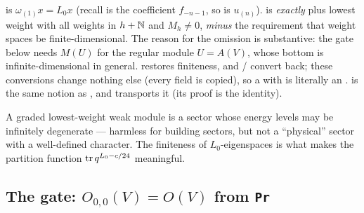 \begin{dictionary}
 is $\omega_{(1)}x = L_0x$ (recall  is the coefficient $f_{-n-1}$, so
 is $u_{(n)}$).  is \emph{exactly}  plus lowest weight
 with all weights in $h+{\mathbb{N}}$ and $M_h\neq0$, \emph{minus} the requirement that weight spaces be finite-dimensional. The
reason for the omission is substantive: the gate below needs $M(U)$ for the regular module $U = A(V)$, whose bottom is
infinite-dimensional in general.  restores finiteness, and / convert
back; these conversions change nothing else (every field is copied), so a  with  is
literally an .  is the same notion as , and
 transports it (its proof is the identity).
\end{dictionary}

\begin{physics}
A graded lowest-weight weak module is a sector whose energy levels may be infinitely degenerate --- harmless for building
sectors, but not a ``physical'' sector with a well-defined character. The finiteness of $L_0$-eigenspaces is what makes the
partition function $\operatorname{tr} q^{L_0-c/24}$ meaningful.
\end{physics}

\subsection{The gate: \texorpdfstring{$O_{0,0}(V) = O(V)$}{O\_\{0,0\}(V)=O(V)} from \texttt{Pr}}

